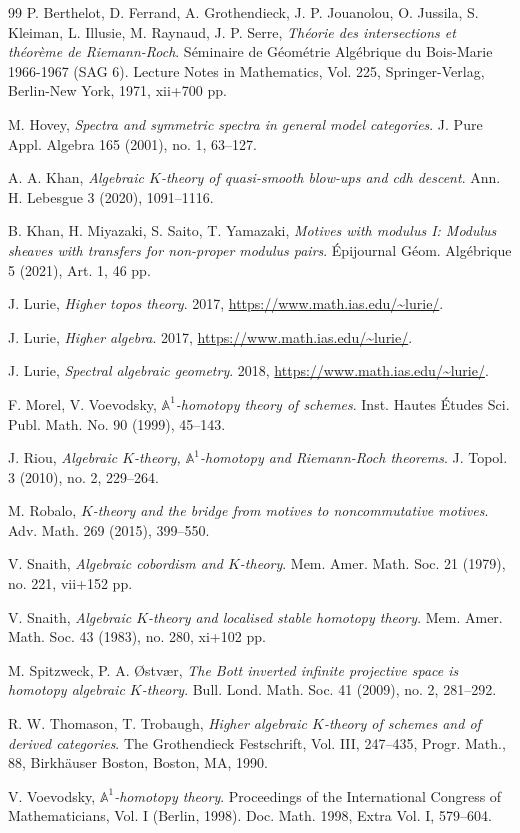 \documentclass{amsart}
\theoremstyle{plain}
\theoremstyle{definition}
\theoremstyle{remark}
\numberwithin{equation}{theorem}
\newcommand{\mbb}[1]{\mathbb{#1}}
\begin{document}
\begin{thebibliography}{99}
P. Berthelot, D. Ferrand, A. Grothendieck, J. P. Jouanolou, O. Jussila, S. Kleiman, L. Illusie, M. Raynaud, J. P. Serre,
\textit{Th\'eorie des intersections et th\'eor\`eme de Riemann-Roch}.
S\'eminaire de G\'eom\'etrie Alg\'ebrique du Bois-Marie 1966-1967 (SAG 6).
Lecture Notes in Mathematics, Vol. 225, Springer-Verlag, Berlin-New York, 1971, xii+700 pp.

M. Hovey,
\textit{Spectra and symmetric spectra in general model categories}.
J. Pure Appl. Algebra 165 (2001), no. 1, 63--127.

A. A. Khan,
\textit{Algebraic $K$-theory of quasi-smooth blow-ups and cdh descent}.
Ann. H. Lebesgue 3 (2020), 1091--1116.

B. Khan, H. Miyazaki, S. Saito, T. Yamazaki,
\textit{Motives with modulus I: Modulus sheaves with transfers for non-proper modulus pairs}.
\'Epijournal G\'eom. Alg\'ebrique 5 (2021), Art. 1, 46 pp.

J. Lurie,
\textit{Higher topos theory}.
2017, \url{https://www.math.ias.edu/~lurie/}.

J. Lurie,
\textit{Higher algebra}.
2017, \url{https://www.math.ias.edu/~lurie/}.

J. Lurie,
\textit{Spectral algebraic geometry}.
2018, \url{https://www.math.ias.edu/~lurie/}.

F. Morel, V. Voevodsky,
\textit{$\mbb{A}^1$-homotopy theory of schemes}.
Inst. Hautes \'Etudes Sci. Publ. Math. No. 90 (1999), 45--143.

J. Riou,
\textit{Algebraic $K$-theory, $\mbb{A}^1$-homotopy and Riemann-Roch theorems}.
J. Topol. 3 (2010), no. 2, 229--264.

M. Robalo,
\textit{$K$-theory and the bridge from motives to noncommutative motives}.
Adv. Math. 269 (2015), 399--550.

V. Snaith,
\textit{Algebraic cobordism and $K$-theory}.
Mem. Amer. Math. Soc. 21 (1979), no. 221, vii+152 pp.

V. Snaith,
\textit{Algebraic $K$-theory and localised stable homotopy theory}.
Mem. Amer. Math. Soc. 43 (1983), no. 280, xi+102 pp.

M. Spitzweck, P. A. \O{}stv\ae{}r,
\textit{The Bott inverted infinite projective space is homotopy algebraic $K$-theory}.
Bull. Lond. Math. Soc. 41 (2009), no. 2, 281--292.

R. W. Thomason, T. Trobaugh,
\textit{Higher algebraic $K$-theory of schemes and of derived categories}.
The Grothendieck Festschrift, Vol. III, 247--435,
Progr. Math., 88, Birkh\"auser Boston, Boston, MA, 1990.

V. Voevodsky,
\textit{$\mbb{A}^1$-homotopy theory}.
Proceedings of the International Congress of Mathematicians, Vol. I (Berlin, 1998).
Doc. Math. 1998, Extra Vol. I, 579--604.

\end{thebibliography}
\end{document}
